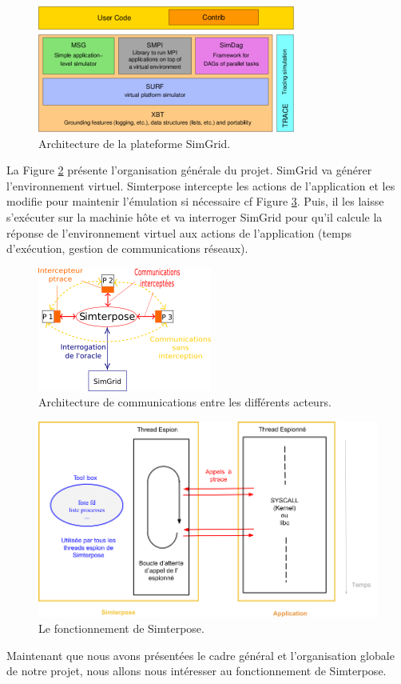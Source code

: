 \begin{figure}[H]
  \centering
  \includegraphics[scale=0.86]{Pictures/png/SimGrid}
  \caption{Architecture de la plateforme SimGrid.}
  \label{SimGrid}
\end{figure}

La Figure \ref{Organisation_generale} présente l'organisation générale du
projet. SimGrid va générer l'environnement virtuel. Simterpose intercepte les
actions de l'application et les modifie pour maintenir l'émulation si
nécessaire cf Figure \ref{Organisation_Simterpose}. Puis, il les laisse
s'exécuter sur la machinie hôte et va interroger SimGrid pour qu'il calcule la
réponse de l'environnement virtuel aux actions de l'application (temps d'exécution, gestion de communications réseaux).

\begin{figure}[H]
  \centering
  \includegraphics{Pictures/png/Communications_Simterpose_interprocess_v2}
  \caption{Architecture de communications entre les différents acteurs.}
  \label{Organisation_generale}
\end{figure}

\begin{figure}[H]
  \centering
  \includegraphics[scale=0.5]{Pictures/png/Simterpose_orga_code_v3}
  \caption{Le fonctionnement de Simterpose.}
  \label{Organisation_Simterpose}
\end{figure}

Maintenant que nous avons présentées le cadre général et l'organisation globale
de notre projet, nous allons nous intéresser au fonctionnement de Simterpose.
